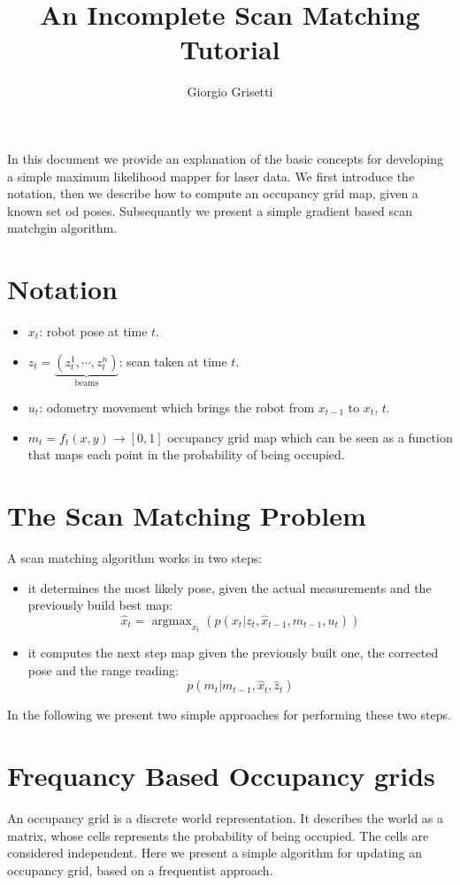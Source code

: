 \documentclass[a4paper]{article}
\begin{document}
\title {An Incomplete Scan Matching Tutorial}
\author{Giorgio Grisetti}
\maketitle
In this document we provide an explanation of the basic concepts for developing a
simple maximum likelihood mapper for laser data.
We first introduce the notation, then we describe how to compute an occupancy grid map, given a known set od poses. Subsequantly we present a simple gradient based scan matchgin algorithm.

\section{Notation}
\begin{itemize}
\item $x_t$: robot pose at time $t$.
\item $z_t=\underbrace{(z^1_t,\cdots,z^n_t)}_\mathrm{beams}$: 
scan taken at time $t$.
\item $u_t$: odometry movement which brings the robot from $x_{t-1}$ to $x_{t}$, $t$.
\item $m_t=f_t(x,y)\rightarrow[0,1]$ occupancy grid map which can be seen as a function that maps each point in the probability of being occupied.
\end{itemize}

\section{The Scan Matching Problem}
A scan matching algorithm works in two steps:
\begin{itemize}
\item it determines the most likely pose, given the actual measurements and the previously build best map:
\begin{equation}
\hat x_t = \mathop{argmax}_{x_t}(p(x_t|z_t, \hat x_{t-1}, m_{t-1}, u_t))
\nonumber
\end{equation}
\item it computes the next step map given the previously built one, the corrected pose and the range reading:
\begin{equation}
p(m_t|m_{t-1}, \hat x_t, \hat z_t)
\nonumber
\end{equation}
\end{itemize}
In the following we present two simple approaches for performing these two steps.

\section{Frequancy Based Occupancy grids}
An occupancy grid is a discrete world representation. It describes the world as a matrix, whose cells represents the probability of being occupied. The cells are considered independent.
Here we present a simple algorithm for updating an occupancy grid, based on a frequentist approach.
\end{document}
